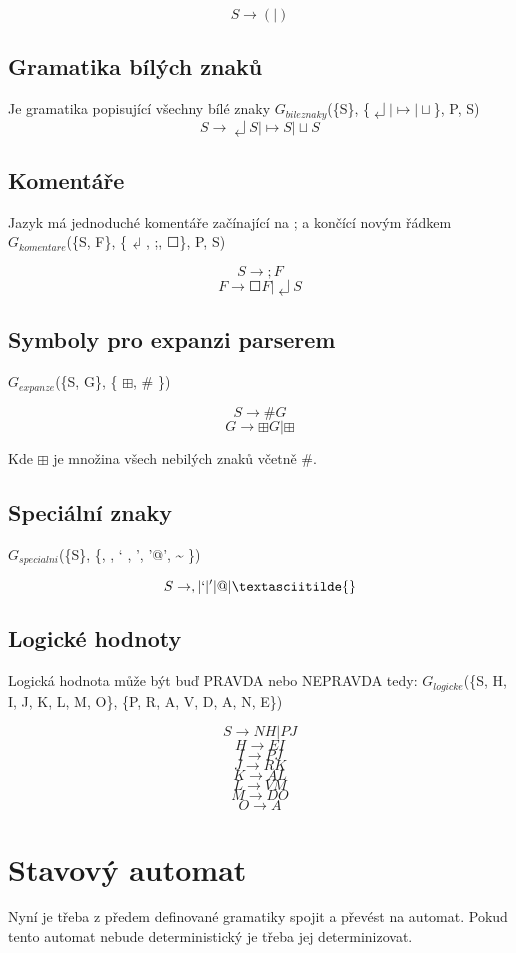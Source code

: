 \documentclass[a4paper,11pt]{article}
\begin{document}
$$S \rightarrow (|)$$

\subsection{Gramatika bílých znaků}
Je gramatika popisující všechny bílé znaky $G_{bileznaky}$(\{S\}, \{$\dlsh | \mapsto | \sqcup$\}, P, S)
$$S \rightarrow  \dlsh S | \mapsto S | \sqcup S$$

\subsection{Komentáře}
Jazyk má jednoduché komentáře začínající na ; a končící novým řádkem $G_{komentare}$(\{S, F\}, \{$\dlsh$, ;, $\Square$\}, P, S)

$$S \rightarrow ;F$$
$$F \rightarrow \Square F | \dlsh S$$

\subsection{Symboly pro expanzi parserem}
$G_{expanze}$(\{S, G\}, \{ $\boxplus$, \# \})

$$S \rightarrow \#G$$
$$G \rightarrow \boxplus G | \boxplus$$

Kde $\boxplus$ je množina všech nebilých znaků včetně \#. 

\subsection{Speciální znaky}
$G_{specialni}$(\{S\}, \{, , ` , ', '@', \textasciitilde{} \})

$$S \rightarrow  , | ` | ' | @ | \textasciitilde{}$$

\subsection{Logické hodnoty}
Logická hodnota může být buď PRAVDA nebo NEPRAVDA tedy:
$G_{logicke}$(\{S, H, I, J, K, L, M, O\}, \{P, R, A, V, D, A, N, E\})

$$S \rightarrow N H | P J$$
$$H \rightarrow E I$$
$$I \rightarrow P J$$ 
$$J \rightarrow R K$$
$$K \rightarrow A L$$
$$L \rightarrow V M$$
$$M \rightarrow D O$$
$$O \rightarrow A$$

\section{Stavový automat}
Nyní je třeba z předem definované gramatiky spojit a převést na automat. Pokud tento automat nebude deterministický je třeba jej determinizovat.
\end{document}

